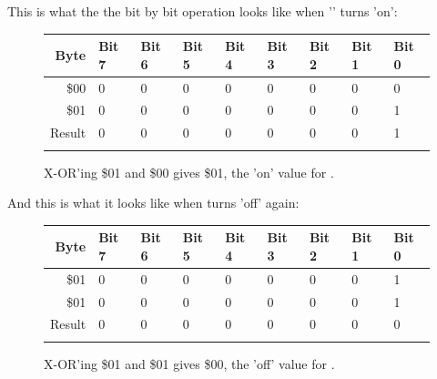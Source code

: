 This is what the the bit by bit operation looks like when '' turns
 'on':

\begin{figure}[H]
  {
    \setlength{\tabcolsep}{3.0pt}
    \setlength\cmidrulewidth{\heavyrulewidth} %
    \begin{adjustbox}{width=7cm,center}

      \begin{tabular}{rllllllll}
        \toprule
        Byte & Bit 7 & Bit 6 & Bit 5 & Bit 4 & Bit 3 & Bit 2 & Bit 1 & Bit 0        \\
        \midrule
        \$00 & 0 & 0 & 0 & 0 & 0 & 0 & 0 & 0 \\
        \$01 & 0 & 0 & 0 & 0 & 0 & 0 & 0 & 1 \\
        \midrule
        Result & 0 & 0 & 0 & 0 & 0 & 0 & 0 & 1 \\
        \addlinespace
        \bottomrule
      \end{tabular}

    \end{adjustbox}

  }\caption*{X-OR'ing \$01 and \$00 gives \$01, the 'on' value for .}
\end{figure}

And this is what it looks like when  turns  'off' again:
\begin{figure}[H]
  {
    \setlength{\tabcolsep}{3.0pt}
    \setlength\cmidrulewidth{\heavyrulewidth} %
    \begin{adjustbox}{width=7cm,center}

      \begin{tabular}{rllllllll}
        \toprule
        Byte & Bit 7 & Bit 6 & Bit 5 & Bit 4 & Bit 3 & Bit 2 & Bit 1 & Bit 0        \\
        \midrule
        \$01 & 0 & 0 & 0 & 0 & 0 & 0 & 0 & 1 \\
        \$01 & 0 & 0 & 0 & 0 & 0 & 0 & 0 & 1 \\
        \midrule
        Result & 0 & 0 & 0 & 0 & 0 & 0 & 0 & 0 \\
        \addlinespace
        \bottomrule
      \end{tabular}

    \end{adjustbox}

  }\caption*{X-OR'ing \$01 and \$01 gives \$00, the 'off' value for .}
\end{figure}
\clearpage

